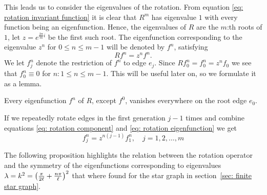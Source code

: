 This leads us to consider the eigenvalues of the rotation. From equation \eqref{eq: rotation invariant function} it is clear that $R^m$ has eigenvalue $1$ with every function being an eigenfunction. Hence, the eigenvalues of $R$ are the $m$:th roots of $1$, let $z = e^{\frac{2\pi}{m}i}$ be the first such root. The eigenfunction corresponding to the eigenvalue $z^n$ for $0 \le n \le m-1$ will be denoted by $f^n$, satisfying
\begin{equation}
  R f^n = z^n f^n. \label{eq: rotation eigenfunction}
\end{equation}
We let $f^n_j$ denote the restriction of $f^n$ to edge $e_j$.
Since $R f^n_0 = f^n_0 = z^n f_0$ we see that $f^n_0 \equiv 0$ for $n: 1 \le n \le m-1$. This will be useful later on, so we formulate it as a lemma.

\begin{lemma}
  Every eigenfunction $f^n$ of $R$, except $f^0$, vanishes everywhere on the root edge $e_0$.
\end{lemma}


If we repeatedly rotate edges in the first generation $j-1$ times and combine equations \eqref{eq: rotation component} and \eqref{eq: rotation eigenfunction} we get
\begin{equation}\label{eq: f^n_j in terms of f^n_1}
  f^n_j = z^{n(j-1)} f^n_1, \quad j = 1, 2, \ldots, m
\end{equation}

The following proposition highlights the relation between the rotation operator and the symmetry of the eigenfunctions corresponding to eigenvalues $\lambda = k^2 = \left(\frac{\pi}{2\ell}+\frac{n\pi}{\ell}\right)^2$ that where found for the star graph in section~\ref{sec: finite star graph}.

